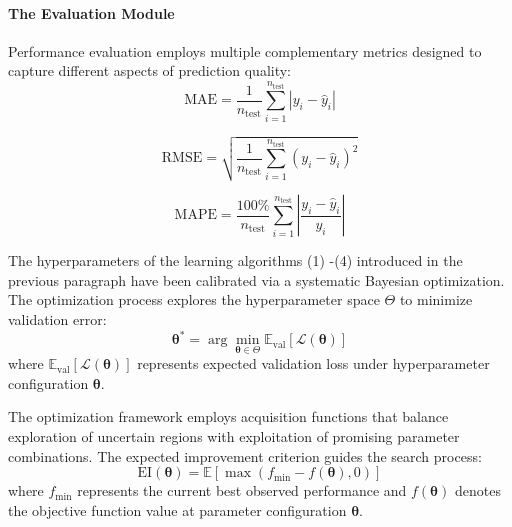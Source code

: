 \documentclass[preprint,12pt]{elsarticle}
\begin{document}
\paragraph{The Evaluation Module}


Performance evaluation employs multiple complementary metrics designed to capture different aspects of prediction quality:
\begin{equation}
\label{mae}
\text{MAE} = \frac{1}{n_{\text{test}}} \sum_{i=1}^{n_{\text{test}}} |y_i - \hat{y}_i|
\end{equation}

\begin{equation}
\label{rmse}
\text{RMSE} = \sqrt{\frac{1}{n_{\text{test}}} \sum_{i=1}^{n_{\text{test}}} (y_i - \hat{y}_i)^2}
\end{equation}

\begin{equation}
\label{mape}
\text{MAPE} = \frac{100\%}{n_{\text{test}}} \sum_{i=1}^{n_{\text{test}}} \left|\frac{y_i - \hat{y}_i}{y_i}\right|
\end{equation}



The hyperparameters of the learning algorithms (1) -(4) introduced in the previous paragraph have been calibrated via a systematic Bayesian optimization. The optimization process explores the hyperparameter space $\Theta$ to minimize validation error:
\begin{equation}
\boldsymbol{\theta}^* = \arg\min_{\boldsymbol{\theta} \in \Theta} \mathbb{E}_{\text{val}}[\mathcal{L}(\boldsymbol{\theta})]
\end{equation}
where $\mathbb{E}_{\text{val}}[\mathcal{L}(\boldsymbol{\theta})]$ represents expected validation loss under hyperparameter configuration $\boldsymbol{\theta}$.

The optimization framework employs acquisition functions that balance exploration of uncertain regions with exploitation of promising parameter combinations. The expected improvement criterion guides the search process:
\begin{equation}
\text{EI}(\boldsymbol{\theta}) = \mathbb{E}[\max(f_{\min} - f(\boldsymbol{\theta}), 0)]
\end{equation}
where $f_{\min}$ represents the current best observed performance and $f(\boldsymbol{\theta})$ denotes the objective function value at parameter configuration $\boldsymbol{\theta}$.


\end{document}
